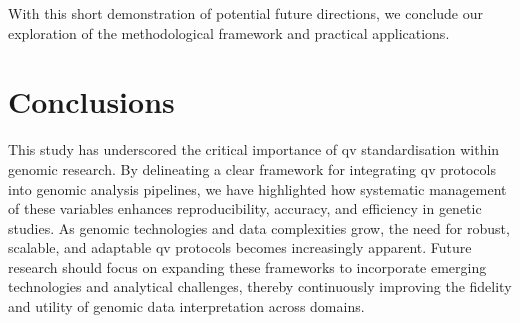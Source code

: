 
With this short demonstration of potential future directions, we conclude our exploration of the methodological framework and practical applications.



\section{Conclusions}
This study has underscored the critical importance of \ac{qv} standardisation within genomic research. 
By delineating a clear framework for integrating \ac{qv} protocols into genomic analysis pipelines, we have highlighted how systematic management of these variables enhances reproducibility, accuracy, and efficiency in genetic studies.
As genomic technologies and data complexities grow, the need for robust, scalable, and adaptable \ac{qv} protocols becomes increasingly apparent. 
Future research should focus on expanding these frameworks to incorporate emerging technologies and analytical challenges, thereby continuously improving the fidelity and utility of genomic data interpretation across domains.




